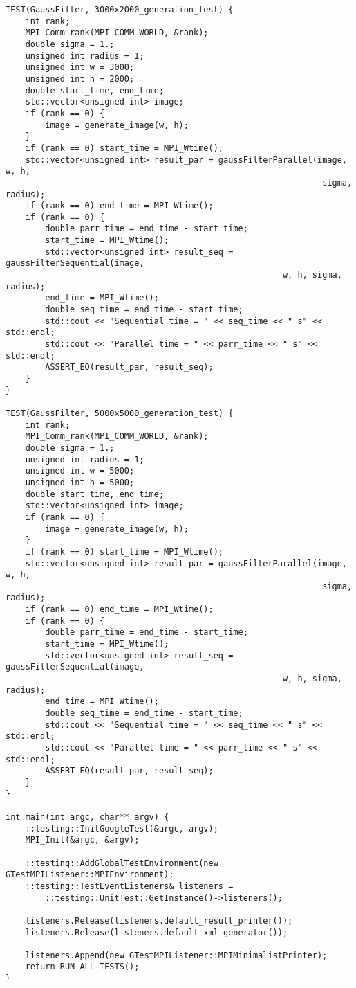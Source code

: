 \documentclass{report}
\begin{document}
\begin{lstlisting}
TEST(GaussFilter, 3000x2000_generation_test) {
    int rank;
    MPI_Comm_rank(MPI_COMM_WORLD, &rank);
    double sigma = 1.;
    unsigned int radius = 1;
    unsigned int w = 3000;
    unsigned int h = 2000;
    double start_time, end_time;
    std::vector<unsigned int> image;
    if (rank == 0) {
        image = generate_image(w, h);
    }
    if (rank == 0) start_time = MPI_Wtime();
    std::vector<unsigned int> result_par = gaussFilterParallel(image, w, h,
                                                                sigma, radius);
    if (rank == 0) end_time = MPI_Wtime();
    if (rank == 0) {
        double parr_time = end_time - start_time;
        start_time = MPI_Wtime();
        std::vector<unsigned int> result_seq = gaussFilterSequential(image,
                                                        w, h, sigma, radius);
        end_time = MPI_Wtime();
        double seq_time = end_time - start_time;
        std::cout << "Sequential time = " << seq_time << " s" << std::endl;
        std::cout << "Parallel time = " << parr_time << " s" << std::endl;
        ASSERT_EQ(result_par, result_seq);
    }
}

TEST(GaussFilter, 5000x5000_generation_test) {
    int rank;
    MPI_Comm_rank(MPI_COMM_WORLD, &rank);
    double sigma = 1.;
    unsigned int radius = 1;
    unsigned int w = 5000;
    unsigned int h = 5000;
    double start_time, end_time;
    std::vector<unsigned int> image;
    if (rank == 0) {
        image = generate_image(w, h);
    }
    if (rank == 0) start_time = MPI_Wtime();
    std::vector<unsigned int> result_par = gaussFilterParallel(image, w, h,
                                                                sigma, radius);
    if (rank == 0) end_time = MPI_Wtime();
    if (rank == 0) {
        double parr_time = end_time - start_time;
        start_time = MPI_Wtime();
        std::vector<unsigned int> result_seq = gaussFilterSequential(image,
                                                        w, h, sigma, radius);
        end_time = MPI_Wtime();
        double seq_time = end_time - start_time;
        std::cout << "Sequential time = " << seq_time << " s" << std::endl;
        std::cout << "Parallel time = " << parr_time << " s" << std::endl;
        ASSERT_EQ(result_par, result_seq);
    }
}

int main(int argc, char** argv) {
    ::testing::InitGoogleTest(&argc, argv);
    MPI_Init(&argc, &argv);

    ::testing::AddGlobalTestEnvironment(new GTestMPIListener::MPIEnvironment);
    ::testing::TestEventListeners& listeners =
        ::testing::UnitTest::GetInstance()->listeners();

    listeners.Release(listeners.default_result_printer());
    listeners.Release(listeners.default_xml_generator());

    listeners.Append(new GTestMPIListener::MPIMinimalistPrinter);
    return RUN_ALL_TESTS();
}

\end{lstlisting}
\end{document}
